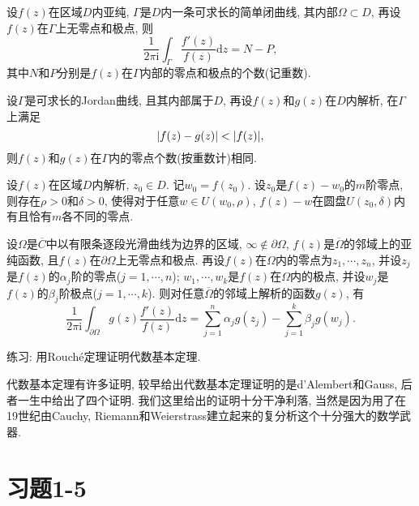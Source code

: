 	\begin{theorem}[辐角原理]
		设$f(z)$在区域$D$内亚纯, $\Gamma$是$D$内一条可求长的简单闭曲线, 其内部$\Omega\subset D$, 再设$f(z)$在$\Gamma$上无零点和极点, 则\begin{equation*}
			\frac{1}{2\pi\mathrm{i}}\int_{\Gamma}\frac{f'(z)}{f(z)}\mathrm{d}z = N-P,
		\end{equation*}
		其中$N$和$P$分别是$f(z)$在$\Gamma$内部的零点和极点的个数(记重数).
	\end{theorem}
	
	\begin{theorem}[Rouché定理]
		设$\Gamma$是可求长的Jordan曲线, 且其内部属于$D$, 再设$f(z)$和$g(z)$在$D$内解析, 在$\Gamma$上满足
		\begin{equation*}
			\lvert f(z)-g(z)\rvert<\lvert f(z)\rvert,
		\end{equation*}
		则$f(z)$和$g(z)$在$\Gamma$内的零点个数(按重数计)相同.
	\end{theorem}
	
	\begin{theorem}[分歧覆盖定理]
		设$f(z)$在区域$D$内解析, $z_0\in D$. 记$w_0 = f(z_0)$. 设$z_0$是$f(z)-w_0$的$m$阶零点, 则存在$\rho>0$和$\delta>0$, 使得对于任意$w\in U(w_0,\rho)$, $f(z)-w$在圆盘$U(z_0,\delta)$内有且恰有$m$各不同的零点.
	\end{theorem}

	\begin{theorem}[辐角原理的推广]
		设$\Omega$是$\overline{C}$中以有限条逐段光滑曲线为边界的区域, $\infty\notin\partial\Omega$, $f(z)$是$\overline{\Omega}$的邻域上的亚纯函数, 且$f(z)$在$\partial\Omega$上无零点和极点. 再设$f(z)$在$\Omega$内的零点为$z_1,\cdots,z_n$, 并设$z_j$是$f(z)$的$\alpha_j$阶的零点($j = 1,\cdots,n$); $w_1,\cdots,w_k$是$f(z)$在$\Omega$内的极点, 并设$w_j$是$f(z)$的$\beta_j$阶极点($j=1,\cdots,k$). 则对任意$\overline{\Omega}$的邻域上解析的函数$g(z)$, 有
		\begin{equation*}
			\frac{1}{2\pi\mathrm{i}}\int_{\partial\Omega}g(z)\frac{f'(z)}{f(z)}\mathrm{d}z = \sum_{j=1}^{n}\alpha_jg(z_j) -\sum_{j= 1}^{k} \beta_jg(w_j).
		\end{equation*}
	\end{theorem}

练习: 用Rouché定理证明代数基本定理.

代数基本定理有许多证明, 较早给出代数基本定理证明的是d'Alembert和Gauss, 后者一生中给出了四个证明. 我们这里给出的证明十分干净利落, 当然是因为用了在19世纪由Cauchy, Riemann和Weierstrass建立起来的复分析这个十分强大的数学武器.
\section{习题1-5}


